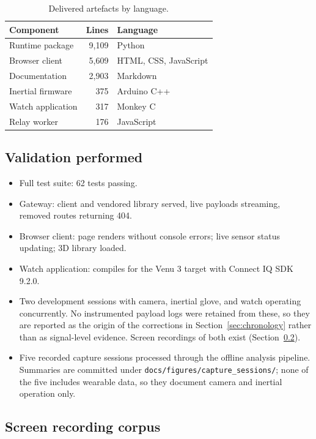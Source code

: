 \documentclass[11pt,a4paper]{article}
\newcommand{\code}[1]{\texttt{\small #1}}
\begin{document}
\begin{table}[H]
\centering
\small
\caption{Delivered artefacts by language.}
\begin{tabular}{@{}lrl@{}}
\toprule
\textbf{Component} & \textbf{Lines} & \textbf{Language} \\
\midrule
Runtime package & 9{,}109 & Python \\
Browser client & 5{,}609 & HTML, CSS, JavaScript \\
Documentation & 2{,}903 & Markdown \\
Inertial firmware & 375 & Arduino C++ \\
Watch application & 317 & Monkey C \\
Relay worker & 176 & JavaScript \\
\bottomrule
\end{tabular}
\end{table}

\subsection{Validation performed}

\begin{itemize}
\item Full test suite: 62 tests passing.
\item Gateway: client and vendored library served, live payloads streaming,
      removed routes returning 404.
\item Browser client: page renders without console errors; live sensor status
      updating; 3D library loaded.
\item Watch application: compiles for the Venu 3 target with Connect IQ SDK
      9.2.0.
\item Two development sessions with camera, inertial glove, and watch operating
      concurrently. No instrumented payload logs were retained from these, so
      they are reported as the origin of the corrections in
      Section~\ref{sec:chronology} rather than as signal-level evidence. Screen
      recordings of both exist (Section~\ref{sec:recordings}).
\item Five recorded capture sessions processed through the offline analysis
      pipeline. Summaries are committed under \code{docs/figures/capture\_sessions/};
      none of the five includes wearable data, so they document camera and
      inertial operation only.
\end{itemize}

\subsection{Screen recording corpus}
\label{sec:recordings}
\end{document}
